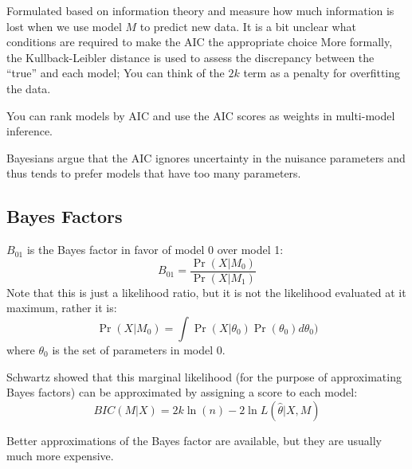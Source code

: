 \documentclass[11pt]{article}
\begin{document}
Formulated based on information theory and measure how much information is lost when we use model $M$ to predict new data.
It is a bit unclear what conditions are required to make the AIC the appropriate choice 
More formally, the Kullback-Leibler distance is used to assess the discrepancy between the ``true'' and each model; You can think of the $2k$ term as a penalty for overfitting the data.

You can rank models by AIC and use the AIC scores as weights in multi-model inference.

Bayesians argue that the AIC ignores uncertainty in the nuisance parameters and thus tends to prefer models that have too many parameters.

\subsection*{Bayes Factors}
$B_{01}$ is the Bayes factor in favor of model 0 over model 1:
$$B_{01} = \frac{\Pr(X|M_0)}{\Pr(X|M_1)}$$
Note that this is just a likelihood ratio, but it is not the likelihood evaluated at it maximum, rather it is:
\begin{equation}
	\Pr(X|M_0) = \int \Pr(X|\theta_0)\Pr(\theta_0) d\theta_0) \label{margLike}
\end{equation}
where $\theta_0$ is the set of parameters in model 0.

Schwartz showed that this marginal likelihood (for the purpose of approximating Bayes factors) can be approximated by assigning a score to each model:
	$$BIC(M|X) = 2k\ln(n) - 2 \ln L(\hat\theta | X, M)$$

Better approximations of the Bayes factor are available, but they are usually much more expensive.
\end{document}
